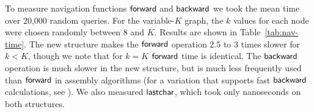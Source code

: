 
To measure navigation functions $\mathsf{forward}$ and $\mathsf{backward}$ we took the mean time 
over 20,000 random queries. For the variable-$K$ graph, the $k$ values for each node 
were chosen randomly between $8$ and $K$. 
Results are shown in Table~\ref{tab:nav-time}. 
The new structure makes the $\mathsf{forward}$ operation $2.5$ to $3$ times slower for $k < K$, though we 
note that for $k = K$ $\mathsf{forward}$ time is identical.
The $\mathsf{backward}$ operation is much slower in the new structure, but is much less frequently 
used than $\mathsf{forward}$ in assembly algorithms (for a variation that supports fast
$\mathsf{backward}$ calculations, see \cite{varorder-latin}). We also measured $\mathsf{lastchar}$, which took only
nanoseconds on both structures.

